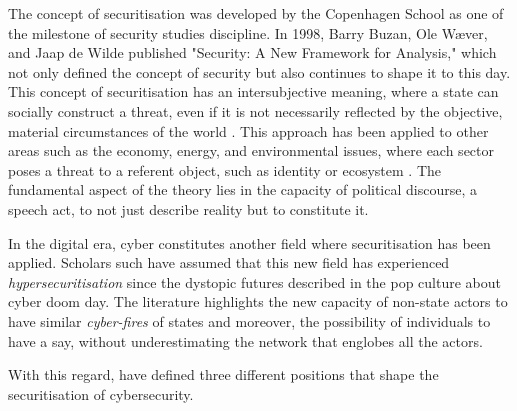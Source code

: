 The concept of securitisation was developed by the Copenhagen School as one of the milestone of security studies discipline. In 1998, Barry Buzan, Ole Wæver, and Jaap de Wilde published "Security: A New Framework for Analysis," which not only defined the concept of security but also continues to shape it to this day. This concept of securitisation has an intersubjective meaning, where a state can socially construct a threat, even if it is not necessarily reflected by the objective, material circumstances of the world \autocite{balzacq_2016_securitization}. This approach has been applied to other areas such as the economy, energy, and environmental issues, where each sector poses a threat to a referent object, such as identity or ecosystem \autocite{eroukhmanoff_2018_securitisation}. The fundamental aspect of the theory lies in the capacity of political discourse, a speech act, to not just describe reality but to constitute it. 

In the digital era, cyber constitutes another field where securitisation has been applied.  Scholars such \textcite{hansen_2009_digital} have assumed that this new field has experienced \textit{hypersecuritisation} since the dystopic futures described in the pop culture about cyber doom day. The literature highlights the new capacity of non-state actors to have similar \textit{cyber-fires} of states and moreover, the possibility of individuals to have a say, without underestimating the network that englobes all the actors. 

With this regard, \textcite{lacy_2018_securitization} have defined three different positions that shape the securitisation of cybersecurity.

